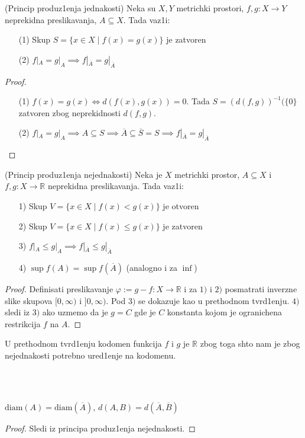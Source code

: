 \documentclass[a4paper,12pt]{article}
\newcommand{\RR}{\mathbb{R}}
\newcommand{\psj}{\subseteq}
\newcommand{\diam}{\mathrm{diam}}
\begin{document}
\begin{tvr}
(Princip produz1enja jednakosti) Neka su $X, Y$ metrichki prostori, $f,g : X \to Y$ neprekidna preslikavanja, $A \psj X$. Tada vaz1i:
\begin{itemize}
\item[(1)] Skup $S = \{x \in X \mid f(x) = g(x) \}$ je zatvoren
\item[(2)] $f|_A = g|_A \implies f|_{\overline{A}} = g|_{\overline{A}}$
\end{itemize}
\end{tvr}
\begin{proof}
\begin{itemize}
\item[(1)] $f(x) = g(x) \Leftrightarrow d(f(x), g(x)) = 0$. Tada $S = {(d(f,g))}^{-1}(\{ 0 \}$ zatvoren zbog neprekidnosti $ d(f,g)$.
\item[(2)] $f|_A = g|_A \implies A \psj S \implies \overline{A} \psj \overline{S} = S \implies f|_{\overline{A}} = g|_{\overline{A}}$
\end{itemize}
\end{proof}

\begin{tvr}
(Princip produz1enja nejednakosti) Neka je $X$ metrichki prostor, $A \psj X$ i $f,g : X \to \RR$ neprekidna preslikavanja. Tada vaz1i:
\begin{itemize}
\item[1)] Skup $V = \{x \in X \mid f(x) < g(x) \}$ je otvoren
\item[2)] Skup $V = \{x \in X \mid f(x) \leq g(x) \}$ je zatvoren
\item[3)] $f|_A \leq g|_A \implies f|_{\overline{A}} \leq g|_{\overline{A}}$
\item[4)] $\sup f(A) = \sup f(\overline{A})$ (analogno i za $\inf$)
\end{itemize}
\end{tvr}

\begin{proof}
Definisati preslikavanje $\varphi := g - f : X \to \RR$ i za $1)$ i $2)$ posmatrati inverzne slike skupova $[0, \infty)$ i $]0, \infty)$. Pod $3)$ se dokazuje kao u prethodnom tvrd1enju. $4)$ sledi iz $3)$ ako uzmemo da je $g = C$ gde je $C$ konstanta kojom je ogranichena restrikcija $f$ na $A$.
\end{proof}

\begin{nap}
U prethodnom tvrd1enju kodomen funkcija $f$ i $g$ je $\RR$ zbog toga shto nam je zbog nejednakosti potrebno ured1enje na kodomenu.
\end{nap}
\\ \\
\begin{posl}
	$\diam(A) = \diam(\overline{A})$, $d(A, B) = d(\overline A, \overline B)$
\end{posl}
\begin{proof}
Sledi iz principa produz1enja nejednakosti.
\end{proof}
\end{document}
